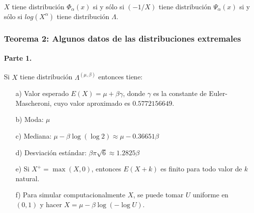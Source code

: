 \documentclass[
  12pt]{article}
\begin{document}
\(X\) tiene distribución \(\Phi_{\alpha}(x)\) si y sólo si \((-1/X)\)
tiene distribución \(\Psi_{\alpha}(x)\) si y sólo si \(log(X^{\alpha})\)
tiene distribución \(\Lambda\).

\hypertarget{teorema-2-algunos-datos-de-las-distribuciones-extremales}{%
\subsubsection{Teorema 2: Algunos datos de las distribuciones
extremales}\label{teorema-2-algunos-datos-de-las-distribuciones-extremales}}

\hypertarget{parte-1.}{%
\paragraph{Parte 1.}\label{parte-1.}}

Si \(X\) tiene distribución \(\Lambda^{(\mu,\beta)}\) entonces tiene:

\begin{itemize}
  \item[a)] Valor esperado $E(X) = \mu + \beta\gamma$, donde $\gamma$ es la constante de Euler-Mascheroni, cuyo valor aproximado es $0.5772156649$.
  \item[b)] Moda: $\mu$
  \item[c)] Mediana: $\mu - \beta \log(\log 2) \approx \mu - 0.36651 \beta$
  \item[d)] Desviación estándar: $\beta \pi \sqrt{6} \approx 1.2825 \beta$
  \item[e)] Si $X^+ = \max(X,0)$, entonces $E(X+k)$ es finito para todo valor de $k$ natural.
  \item[f)] Para simular computacionalmente $X$, se puede tomar $U$ uniforme en $(0,1)$ y hacer $X = \mu - \beta \log(-\log U)$.
\end{itemize}
\end{document}
